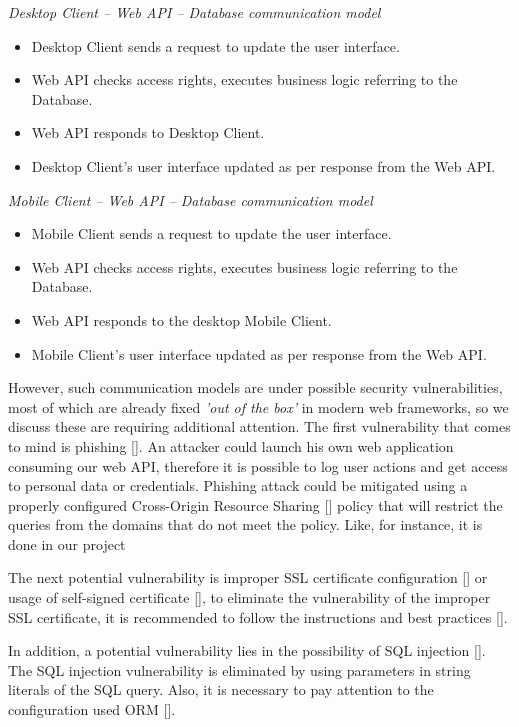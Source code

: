 \textit{Desktop Client -- Web API -- Database communication model}
\begin{itemize}
    \item Desktop Client sends a request to update the user interface.
    \item Web API checks access rights, executes business logic referring to the Database.
    \item Web API responds to Desktop Client.
    \item Desktop Client's user interface updated as per response from the Web API\@.
\end{itemize}

\textit{Mobile Client -- Web API -- Database communication model}
\begin{itemize}
    \item Mobile Client sends a request to update the user interface.
    \item Web API checks access rights, executes business logic referring to the Database.
    \item Web API responds to the desktop Mobile Client.
    \item Mobile Client's user interface updated as per response from the Web API\@.
\end{itemize}

However, such communication models are under possible security vulnerabilities, most of which are already fixed
\textit{'out of the box'} in modern web frameworks, so we discuss these are requiring additional attention.
The first vulnerability that comes to mind is phishing [\cite{dhamija2006phishing}].
An attacker could launch his own web application consuming our web API, therefore it is possible to log user actions
and get access to personal data or credentials.
Phishing attack could be mitigated using a properly configured Cross-Origin Resource Sharing [\cite{gibbinscross}]
policy that will restrict the queries from the domains that do not meet the policy.
Like, for instance, it is done in our project



The next potential vulnerability is improper SSL certificate configuration [\cite{georgiev2012most, el2012most}]
or usage of self-signed certificate [\cite{kappenberger2012true}],
to eliminate the vulnerability of the improper SSL certificate, it is recommended to follow the instructions
and best practices [\cite{rapp2021web}].

In addition, a potential vulnerability lies in the possibility of SQL injection [\cite{halfond2006classification}].
The SQL injection vulnerability is eliminated by using parameters in string literals of the SQL query.
Also, it is necessary to pay attention to the configuration used ORM [\cite{tiwari2015study}].

